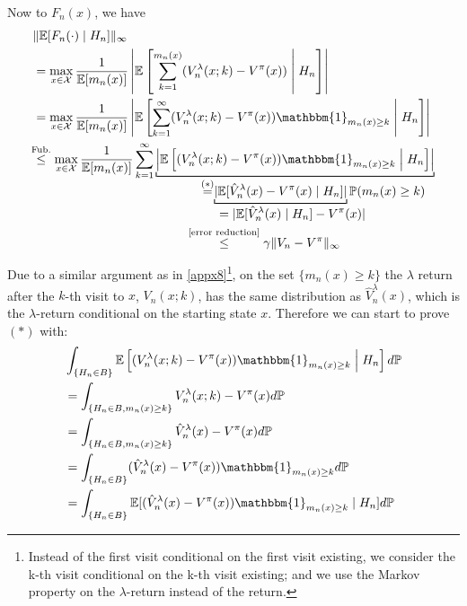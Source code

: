 Now to \(F_n(x)\), we have
\begin{align*}
    &\|\E[F_n(\cdot)\mid H_n]\|_\infty\\
    &= \max_{x\in\cX}\frac{1}{\E[m_n(x)]}
    \left| \E\left[\sum_{k=1}^{m_n(x)}(V_n^\lambda(x;k)-V^\pi(x)) \;\middle|\; H_n \right]\right| \\
    &= \max_{x\in\cX}\frac{1}{\E[m_n(x)]}
    \left| \E\left[\sum_{k=1}^\infty (V_n^\lambda(x;k)-V^\pi(x))\mathbbm{1}_{m_n(x)\ge k} \;\middle|\; H_n \right]\right|\\
    &\lxlq{\text{Fub.}} \max_{x\in\cX}\frac{1}{\E[m_n(x)]}
    \sum_{k=1}^\infty 
    \underbracket[0.7pt]{
        \left| \E\left[ (V_n^\lambda(x;k)-V^\pi(x))\mathbbm{1}_{m_n(x)\ge k} \;\middle|\; H_n \right]\right|
    }_{
    \mathclap{
        \qquad\quad\lxeq{(*)} \underbracket[0.7pt]{
            |\E[ \hat{V}^\lambda_n(x)- V^\pi(x)\mid H_n]|
        }_{
        \mathclap{
            \begin{aligned}[t]\scriptsize
                \qquad&=|\E[\hat{V}_n^\lambda(x)\mid H_n]-V^\pi(x)|\\
                &\lxlq{\text{\ref{error reduction}}}\gamma \|V_n-V^\pi\|_\infty
            \end{aligned}
        }
        }
        \textstyle \Pr(m_n(x)\ge k)
    }
    }
\end{align*}
Due to a similar argument as in \ref{appx8}\footnote{Instead of the first visit conditional on the first visit existing, we consider the k-th visit conditional on the k-th visit existing; and we use the Markov property on the \(\lambda\)-return instead of the return.}, on the set \(\{m_n(x)\ge k\}\) the \(\lambda\) return after the \(k\)-th visit to \(x\), \(V_n(x;k)\), has the same distribution as \(\hat{V}_n^\lambda(x)\), which is the \(\lambda\)-return conditional on the starting state \(x\). Therefore we can start to prove \((*)\) with:
\begin{align*}
    &\int_{\{H_n\in B\}} \E\left[ (V_n^\lambda(x;k)-V^\pi(x))\mathbbm{1}_{m_n(x)\ge k} \;\middle|\; H_n \right]d\Pr\\
    &= \int_{\{H_n\in B, m_n(x)\ge k\}} V_n^\lambda(x;k)-V^\pi(x)d\Pr\\
    &=\int_{\{H_n\in B,m_n(x)\ge k\}} \hat{V}_n^\lambda(x)-V^\pi(x)d\Pr\\
    &=\int_{\{H_n\in B\}} (\hat{V}_n^\lambda(x)-V^\pi(x)) \mathbbm{1}_{m_n(x)\ge k}d\Pr\\
    &=\int_{\{H_n\in B\}} \E[(\hat{V}_n^\lambda(x)-V^\pi(x)) \mathbbm{1}_{m_n(x)\ge k}\mid H_n] d\Pr
\end{align*}
